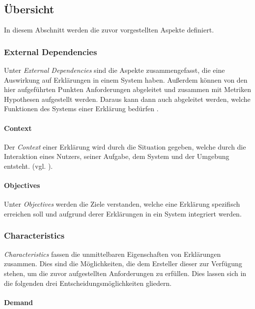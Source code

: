 \subsection{Übersicht}

In diesem Abschnitt werden die zuvor vorgestellten Aspekte definiert.

\subsubsection{External Dependencies}

Unter \textit{External Dependencies} sind die Aspekte zusammengefasst, die eine Auswirkung auf Erklärungen in einem System haben. Außerdem können von den hier aufgeführten Punkten Anforderungen abgeleitet und zusammen mit Metriken Hypothesen aufgestellt werden. Daraus kann dann auch abgeleitet werden, welche Funktionen des Systems einer Erklärung bedürfen \cite{kohl_explainability_2019}.

\paragraph{Context} Der \textit{Context} einer Erklärung wird durch die Situation gegeben, welche durch die Interaktion eines Nutzers, seiner Aufgabe, dem System und der Umgebung entsteht. (vgl. \cite{chazette_knowledge_nodate, kohl_explainability_2019}).

\paragraph{Objectives} Unter \textit{Objectives} werden die Ziele verstanden, welche eine Erklärung spezifisch erreichen soll und aufgrund derer Erklärungen in ein System integriert werden.

\subsubsection{Characteristics}

\textit{Characteristics} fassen die unmittelbaren Eigenschaften von Erklärungen zusammen. Dies sind die Möglichkeiten, die dem Ersteller dieser zur Verfügung stehen, um die zuvor aufgestellten Anforderungen zu erfüllen. Dies lassen sich in die folgenden drei Entscheidungsmöglichkeiten gliedern.

\paragraph{Demand}

